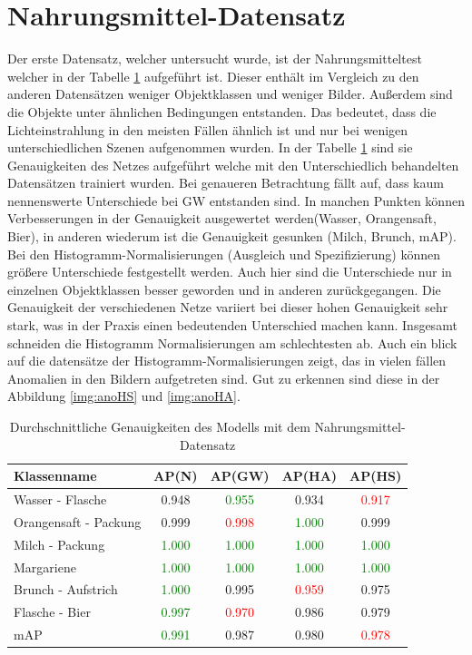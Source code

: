   \section{Nahrungsmittel-Datensatz}
Der erste Datensatz, welcher untersucht wurde, ist der Nahrungsmitteltest welcher in der Tabelle \ref{tab:nahrungsmitteltest} aufgeführt ist. Dieser enthält im Vergleich zu den anderen Datensätzen weniger Objektklassen und weniger Bilder. Außerdem sind die Objekte unter ähnlichen Bedingungen entstanden. Das bedeutet, dass die Lichteinstrahlung in den meisten Fällen ähnlich ist und nur bei wenigen unterschiedlichen Szenen aufgenommen wurden. In der Tabelle \ref{tab:nahrungsmitteltest} sind sie Genauigkeiten des Netzes aufgeführt welche mit den Unterschiedlich behandelten Datensätzen trainiert wurden. Bei genaueren Betrachtung fällt auf, dass kaum nennenswerte Unterschiede bei GW entstanden sind. In manchen Punkten können Verbesserungen in der Genauigkeit ausgewertet werden(Wasser, Orangensaft, Bier), in anderen wiederum ist die Genauigkeit gesunken (Milch, Brunch, mAP).\\
Bei den Histogramm-Normalisierungen (Ausgleich und Spezifizierung) können größere Unterschiede festgestellt werden. Auch hier sind die Unterschiede nur in einzelnen Objektklassen besser geworden und in anderen zurückgegangen. Die Genauigkeit der verschiedenen Netze variiert bei dieser hohen Genauigkeit sehr stark, was in der Praxis einen bedeutenden Unterschied machen kann. Insgesamt schneiden die Histogramm Normalisierungen am schlechtesten ab. Auch ein blick auf die datensätze der Histogramm-Normalisierungen zeigt, das in vielen fällen Anomalien in den Bildern aufgetreten sind. Gut zu erkennen sind diese in der Abbildung \ref{img:anoHS} und \ref{img:anoHA}.
\begin{table}
[h]
\caption{Durchschnittliche Genauigkeiten des Modells mit dem Nahrungsmittel-Datensatz}
\centering
\begin{tabular}{|l|c|c|c|c|}
\hline
Klassenname & AP(N) & AP(GW) & AP(HA) & AP(HS)\\
\hline
Wasser - Flasche & 0.948 & \textcolor{green}{0.955} & 0.934 & \textcolor{red}{0.917}\\
Orangensaft - Packung & 0.999 & \textcolor{red}{0.998} & \textcolor{green}{1.000} & 0.999\\
Milch - Packung & \textcolor{green}{1.000} & \textcolor{green}{1.000} & \textcolor{green}{1.000} & \textcolor{green}{1.000}\\
Margariene & \textcolor{green}{1.000} & \textcolor{green}{1.000} & \textcolor{green}{1.000} & \textcolor{green}{1.000}\\
Brunch - Aufstrich & \textcolor{green}{1.000} & 0.995 & \textcolor{red}{0.959} & 0.975\\
Flasche - Bier & \textcolor{green}{0.997} & \textcolor{red}{0.970} & 0.986 & 0.979\\
\hline
mAP & \textcolor{green}{0.991} & 0.987 & 0.980 & \textcolor{red}{0.978}\\
\hline
\end{tabular}
\label{tab:nahrungsmitteltest}
\end{table}

